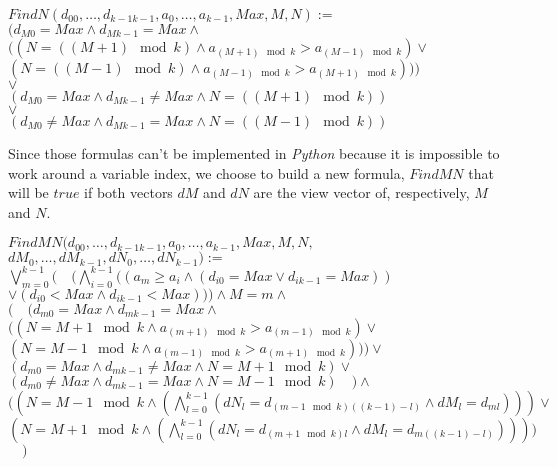 \documentclass{article}
\begin{document}
\begin{center}

$FindN(d_{00}, \ldots ,d_{k-1k-1}, a_{0}, \ldots , a_{k-1}, Max, M, N):=$\\
$(d_{M0} = Max \land d_{Mk-1} = Max \land $\\
$( (N = ((M+1) \mod{k}) \land a_{(M+1) \mod{k}} > a_{(M-1) \mod{k}}) \lor $\\
$(N = ((M-1) \mod{k}) \land a_{(M-1) \mod{k}} > a_{(M+1) \mod{k}})))$\\
$ \lor$\\
$(d_{M0} = Max \land d_{Mk-1} \not= Max \land N = ((M+1)\mod{k}))$\\
$ \lor$\\
$(d_{M0} \not= Max \land d_{Mk-1} = Max \land N = ((M-1)\mod{k}))$
\end{center}

Since those formulas can't be implemented in \textit{Python} because it is impossible to work around a variable index, we choose to build a new formula, $FindMN$ that will be $true$ if both vectors $dM$ and $dN$ are the view vector of, respectively, $M$ and $N$.

\begin{center}

$FindMN(d_{00}, \ldots ,d_{k-1k-1}, a_{0}, \ldots , a_{k-1}, Max, M, N,$\\
$ dM_{0}, \dots, dM_{k-1}, dN_{0}, \dots, dN_{k-1}):=$\\
$\bigvee_{m=0}^{k-1}(\quad
(\bigwedge_{i=0}^{k-1} ((a_{m} \geq a_i \land (d_{i0} = Max \lor d_{ik-1} = Max))$\\
$\lor (d_{i0} < Max \land d_{ik-1} < Max))) \land M = m \land $\\ 
$(\quad (
d_{m0} = Max \land d_{mk-1} = Max \land $\\
$( ( N = M+1 \mod k \land a_{(m+1) \mod{k}} > a_{(m-1) \mod{k}}) \lor $\\
$( N = M-1 \mod{k} \land a_{(m-1) \mod{k}} > a_{(m+1) \mod{k}}))
)\lor $\\
$(
d_{m0} = Max \land d_{mk-1} \not= Max \land N = M+1 \mod k
) \lor$\\
$(
d_{m0} \not= Max \land d_{mk-1} = Max \land N = M-1 \mod{k}
)\quad ) \land $\\
$( (N = M-1\mod{k} \land (\bigwedge_{l = 0}^{k-1} (dN_{l} = d_{(m-1 \mod{k}) ((k-1)-l)} \land dM_{l} = d_{ml}) ) ) \lor $\\
$(N = M+1\mod{k} \land (\bigwedge_{l = 0}^{k-1} (dN_{l} = d_{(m+1 \mod{k})l} \land dM_{l} = d_{m((k-1)-l)}) ) ) )$
$\quad )$
\end{center}
\end{document}

